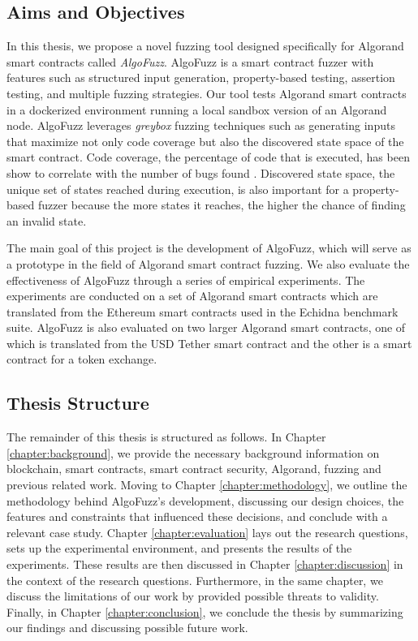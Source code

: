 \subsection*{Aims and Objectives}
In this thesis, we propose a novel fuzzing tool designed specifically for Algorand smart contracts called \textit{AlgoFuzz}.
AlgoFuzz is a smart contract fuzzer with features such as structured input generation, property-based testing, assertion testing, and multiple fuzzing strategies.
Our tool tests Algorand smart contracts in a dockerized environment running a local sandbox version of an Algorand node.
AlgoFuzz leverages \textit{greybox} fuzzing techniques such as generating inputs that maximize not only code coverage but also the discovered state space of the smart contract.
Code coverage, the percentage of code that is executed, has been show to correlate with the number of bugs found \cite{kochhar_code_2015}.
Discovered state space, the unique set of states reached during execution, is also important for a property-based fuzzer because the more states it reaches, the higher the chance of finding an invalid state.

The main goal of this project is the development of AlgoFuzz, which will serve as a prototype in the field of Algorand smart contract fuzzing.
We also evaluate the effectiveness of AlgoFuzz through a series of empirical experiments.
The experiments are conducted on a set of Algorand smart contracts which are translated from the Ethereum smart contracts used in the Echidna benchmark suite.
AlgoFuzz is also evaluated on two larger Algorand smart contracts, one of which is translated from the USD Tether \cite{etherscanio_tether_nodate} smart contract and the other is a smart contract for a token exchange.

\subsection*{Thesis Structure}
The remainder of this thesis is structured as follows.
In Chapter \ref{chapter:background}, we provide the necessary background information on blockchain, smart contracts, smart contract security, Algorand, fuzzing and previous related work.
Moving to Chapter \ref{chapter:methodology}, we outline the methodology behind AlgoFuzz's development, discussing our design choices, the features and constraints that influenced these decisions, and conclude with a relevant case study.
Chapter \ref{chapter:evaluation} lays out the research questions, sets up the experimental environment, and presents the results of the experiments.
These results are then discussed in Chapter \ref{chapter:discussion} in the context of the research questions. Furthermore, in the same chapter, we discuss the limitations of our work by provided possible threats to validity.
Finally, in Chapter \ref{chapter:conclusion}, we conclude the thesis by summarizing our findings and discussing possible future work.



